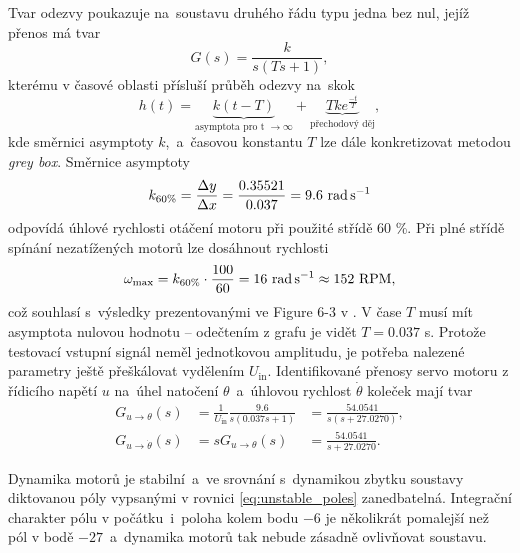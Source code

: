 \documentclass[conference]{IEEEtran}
\begin{document}
Tvar odezvy poukazuje na~soustavu druhého řádu typu jedna bez nul, jejíž přenos má tvar
\begin{equation}
    G(s) = \frac{k}{s(Ts+1)},
    \label{eq:servo_prenos}
\end{equation}
kterému v časové oblasti přísluší průběh odezvy na~skok
\begin{equation}
    h(t) = \underbrace{k(t-T)}_{\text{asymptota pro t $\to \infty$}} + \underbrace{Tk e^{\frac{-t}{T}}}_{\text{přechodový děj}},
    \label{eq:servo_odezva}
\end{equation}
kde směrnici asymptoty $k$,~a~časovou konstantu $T$ lze dále konkretizovat metodou \textit{grey box}.
Směrnice asymptoty
\begin{equation}
    k_{60\%} = \frac{\Delta y}{\Delta x} = \frac{0.35521}{0.037} = 9.6~\text{\si{\radian\per\second}}
\end{equation}
odpovídá úhlové rychlosti otáčení motoru při použité střídě $60$ \%. Při plné střídě spínání nezatížených motorů lze dosáhnout rychlosti
\begin{equation*}
    \omega_\text{max} = k_{60\%} \cdot \frac{100}{60} = 16~\text{\si{\radian\per\second}} \approx 152~\text{RPM},
\end{equation*}
což souhlasí s~výsledky prezentovanými ve Figure 6-3 v \cite{model_based_design}.
V čase $T$ musí mít asymptota nulovou hodnotu -- odečtením z grafu je vidět $T = 0.037$ \si{\second}.
Protože testovací vstupní signál neměl jednotkovou amplitudu, je potřeba nalezené parametry ještě přeškálovat vydělením $U_\text{in}$. 
Identifikované přenosy servo motoru z řídicího napětí $u$ na~úhel natočení $\theta$~a~úhlovou rychlost $\dot{\theta}$ koleček mají tvar
\begin{equation}
    \begin{aligned}
        G_{u\to\theta}(s) &= \frac{1}{U_\text{in}} \frac{9.6}{s(0.037s + 1)}   &=  \frac{54.0541}{s(s+27.0270)}, \\
        G_{u\to\dot{\theta}}(s) &= sG_{u\to\theta}(s) &= \frac{54.0541}{s+27.0270}.
    \end{aligned}
\end{equation} 

Dynamika motorů je stabilní~a~ve srovnání s~dynamikou zbytku soustavy diktovanou póly vypsanými v rovnici \eqref{eq:unstable_poles} zanedbatelná.
Integrační charakter pólu v počátku~i~poloha kolem bodu $-6$ je několikrát pomalejší než pól v bodě $-27$~a~dynamika motorů tak nebude zásadně ovlivňovat soustavu.
\end{document}
